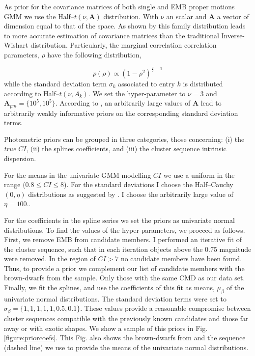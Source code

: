 As prior for the covariance matrices of both single and EMB proper motions GMM we use the Half--$t(\nu,\mathbf{A})$ distribution. With $\nu$ an scalar and $\mathbf{A}$ a vector of dimension equal to that of the space. As shown by \citet{Huang2013} this family distribution leads to more accurate estimation of covariance matrices than the traditional Inverse-Wishart distribution. Particularly, the marginal correlation correlation parameters, $\rho$ have the following distribution,

\begin{equation}
p(\rho) \propto (1-\rho^2)^{\frac{\nu}{2}-1}
\end{equation}
while the standard deviation term $\sigma_k$ associated to entry $k$ is distributed according to Half--$t(\nu,A_k)$. We set the hyper-parameter to $\nu=3$ and $\boldsymbol{A}_{pm}=\{10^5,10^5\}$. According to \citet{Huang2013}, an arbitrarily large values of $\boldsymbol{A}$ lead to arbitrarily weakly informative priors on the corresponding standard deviation terms.

Photometric priors can be grouped in three categories, those concerning: (i) the \emph{true} $CI$, (ii) the splines coefficients, and (iii) the cluster sequence intrinsic dispersion. 

For the means in the univariate GMM modelling $CI$ we use a uniform in the range  ($0.8\leq CI \leq8$). For the standard deviations I choose the Half--Cauchy$(0,\eta)$ distributions as suggested by \citet{Gelman2006}. I choose the arbitrarily large value of $\eta=100$..

\sloppy
For the coefficients in the spline series we set the priors as univariate normal distributions. To find the values of the hyper-parameters, we proceed as follows. First, we remove EMB from \citet{Bouy2015} candidate members. I performed an iterative fit of the cluster sequence, such that in each iteration objects above the 0.75 magnitude were removed. In the region of $CI > 7$ no candidate members have been found. Thus, to provide a prior we complement our list of candidate members with the brown-dwarfs from the \citet{Faherty2012} sample. Only those with the same CMD as our data set. Finally, we fit the splines, and use the coefficients of this fit as means, $\mu_{\beta}$ of the univariate normal distributions. The standard deviation terms were set to $\sigma_{\beta}=\{1,1,1,1,1,0.5,0.1\}$. These values provide a reasonable compromise between cluster sequences compatible with the previously known candidates and those far away or with exotic shapes. We show a sample of this priors in Fig. \ref{figure:priorcoefs}. This Fig. also shows the brown-dwarfs from \citet{Faherty2012} and the sequence (dashed line) we use to provide the means of the univariate normal distributions.

